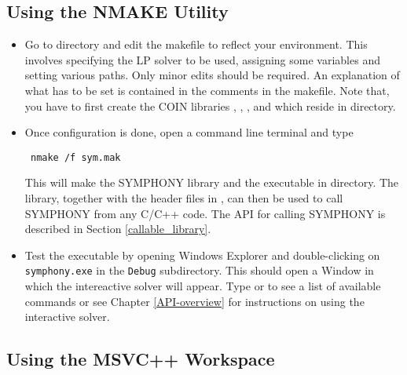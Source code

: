 \subsection{Using the NMAKE Utility}
\label{using_nmake}

\begin{itemize}
\item Go to  directory and edit the  
makefile to reflect 
your environment. This involves specifying the LP solver to be used, 
assigning some variables and  setting various paths. Only minor edits 
should be required. An explanation of what has to be set is contained in the 
comments in the makefile.  Note that, you have to first create the COIN 
libraries , , ,  and  
which reside in  directory.

\item Once configuration is done, open a command line terminal and type 
{\color{Brown}
\begin{verbatim}
 nmake /f sym.mak
\end{verbatim}
}
This will make the SYMPHONY library  and the executable 
 in  directory. The library, together with the 
header files in , can then be used to call 
SYMPHONY from any C/C++ code. The API for calling SYMPHONY is described in 
Section \ref{callable_library}.

\item Test the executable by opening Windows Explorer and double-clicking
on {\color{Brown}\texttt{symphony.exe}} in the
{\color{Brown}\texttt{Debug\bs}} subdirectory. This should open a Window in
which the intereactive solver will appear. Type  or  to see
a list of available commands or see Chapter \ref{API-overview} for
instructions on using the interactive solver.

\end{itemize}

\subsection{Using the MSVC++ Workspace}

